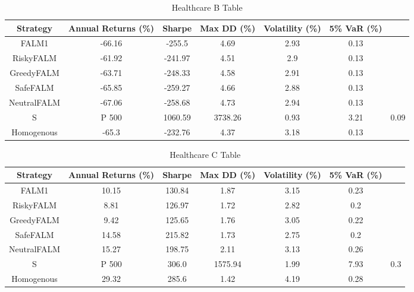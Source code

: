 \begin{table}[]
    \centering
    \caption{Healthcare B Table}
    \begin{tabular}{|c|c|c|c|c|c|c|}
        \hline
        Strategy & Annual Returns (\%) & Sharpe & Max \ac{DD} (\%) & Volatility (\%)& 5\% \ac{VaR} (\%) \\
        \hline
        FALM1 & -66.16 & -255.5 & 4.69 & 2.93 & 0.13 \\
        RiskyFALM & -61.92 & -241.97 & 4.51 & 2.9 & 0.13 \\
        GreedyFALM & -63.71 & -248.33 & 4.58 & 2.91 & 0.13 \\
        SafeFALM & -65.85 & -259.27 & 4.66 & 2.88 & 0.13 \\
        NeutralFALM & -67.06 & -258.68 & 4.73 & 2.94 & 0.13 \\
        S&P 500 & 1060.59 & 3738.26 & 0.93 & 3.21 & 0.09 \\
        Homogenous & -65.3 & -232.76 & 4.37 & 3.18 & 0.13 \\
        \hline
    \end{tabular}
    \label{tab:healthcare_b_table}
\end{table}

\begin{table}[]
    \centering
    \caption{Healthcare C Table}
    \begin{tabular}{|c|c|c|c|c|c|c|}
        \hline
        Strategy & Annual Returns (\%) & Sharpe & Max \ac{DD} (\%) & Volatility (\%)& 5\% \ac{VaR} (\%) \\
        \hline
        FALM1 & 10.15 & 130.84 & 1.87 & 3.15 & 0.23 \\
        RiskyFALM & 8.81 & 126.97 & 1.72 & 2.82 & 0.2 \\
        GreedyFALM & 9.42 & 125.65 & 1.76 & 3.05 & 0.22 \\
        SafeFALM & 14.58 & 215.82 & 1.73 & 2.75 & 0.2 \\
        NeutralFALM & 15.27 & 198.75 & 2.11 & 3.13 & 0.26 \\
        S&P 500 & 306.0 & 1575.94 & 1.99 & 7.93 & 0.3 \\
        Homogenous & 29.32 & 285.6 & 1.42 & 4.19 & 0.28 \\
        \hline
    \end{tabular}
    \label{tab:healthcare_c_table}
\end{table}

